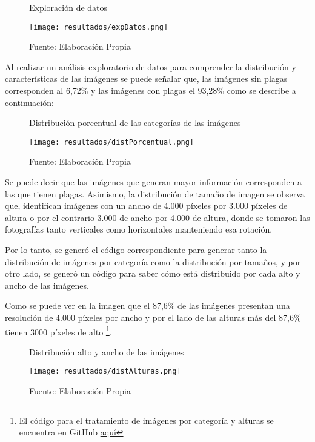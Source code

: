\newpage

\begin{figure}[h]
\centering
\caption{Exploración de datos}
\texttt{[image: resultados/expDatos.png]}
\caption*{\footnotesize Fuente: Elaboración Propia}
\label{fig:figuraExpDatos}
\end{figure}

Al realizar un análisis exploratorio de datos para comprender la distribución y características de las imágenes se puede señalar que, las imágenes sin plagas corresponden al 6,72\% y las imágenes con plagas el 93,28\% como se describe a continuación:

\begin{figure}[h]
\centering
\caption{Distribución porcentual de las categorías de las imágenes}
\texttt{[image: resultados/distPorcentual.png]}
\caption*{\footnotesize Fuente: Elaboración Propia}
\label{fig:figuraDistPorcentual}
\end{figure}

Se puede decir que las imágenes que generan mayor información corresponden a las que tienen plagas. Asimismo, la distribución de tamaño de imagen se observa que, identifican imágenes con un ancho de 4.000 píxeles por 3.000 píxeles de altura o por el contrario 3.000 de ancho por 4.000 de altura, donde se tomaron las fotografías tanto verticales como horizontales manteniendo esa rotación.

\newpage

Por lo tanto, se generó el código correspondiente para generar tanto la distribución de imágenes por categoría como la distribución por tamaños, y por otro lado, se generó un código para saber cómo está distribuido por cada alto y ancho de las imágenes. 

Como se puede ver en la imagen que el 87,6\% de las imágenes presentan una resolución de 4.000 píxeles por ancho y por el lado de las alturas más del 87,6\% tienen 3000 píxeles de alto \footnote{El código para el tratamiento de imágenes por categoría y alturas se encuentra en GitHub \href{https://github.com/juferoto/mlops_project/blob/master/notebooks/analisisExploratorio.ipynb}{aquí}}.

\begin{figure}[h]
\centering
\caption{Distribución alto y ancho de las imágenes}
\texttt{[image: resultados/distAlturas.png]}
\caption*{\footnotesize Fuente: Elaboración Propia}
\label{fig:figuraDistAlturas}
\end{figure}

